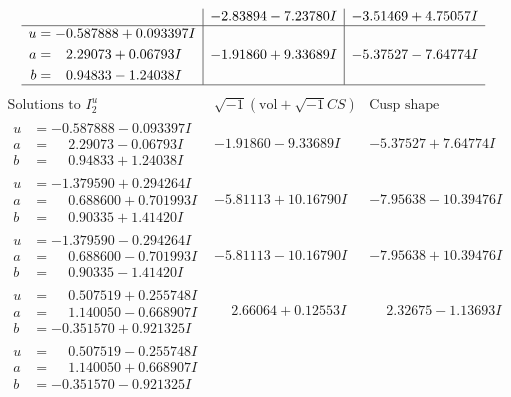 \documentclass[1p]{elsarticle_modified}
\theoremstyle{definition}
\newcommand{\I}{\sqrt{-1}}
\begin{document}
$$\begin{array}{c|c|c}
 & -2.83894 - 7.23780 I & -3.51469 + 4.75057 I \\ \hline\begin{aligned}
u &= -0.587888 + 0.093397 I \\
a &= \phantom{-}2.29073 + 0.06793 I \\
b &= \phantom{-}0.94833 - 1.24038 I\end{aligned}
 & -1.91860 + 9.33689 I & -5.37527 - 7.64774 I\\
 \hline 
 \end{array}$$\newpage$$\begin{array}{c|c|c}  
\text{Solutions to }I^u_{2}& \I (\text{vol} + \sqrt{-1}CS) & \text{Cusp shape}\\
 \hline 
\begin{aligned}
u &= -0.587888 - 0.093397 I \\
a &= \phantom{-}2.29073 - 0.06793 I \\
b &= \phantom{-}0.94833 + 1.24038 I\end{aligned}
 & -1.91860 - 9.33689 I & -5.37527 + 7.64774 I \\ \hline\begin{aligned}
u &= -1.379590 + 0.294264 I \\
a &= \phantom{-}0.688600 + 0.701993 I \\
b &= \phantom{-}0.90335 + 1.41420 I\end{aligned}
 & -5.81113 + 10.16790 I & -7.95638 - 10.39476 I \\ \hline\begin{aligned}
u &= -1.379590 - 0.294264 I \\
a &= \phantom{-}0.688600 - 0.701993 I \\
b &= \phantom{-}0.90335 - 1.41420 I\end{aligned}
 & -5.81113 - 10.16790 I & -7.95638 + 10.39476 I \\ \hline\begin{aligned}
u &= \phantom{-}0.507519 + 0.255748 I \\
a &= \phantom{-}1.140050 - 0.668907 I \\
b &= -0.351570 + 0.921325 I\end{aligned}
 & \phantom{-}2.66064 + 0.12553 I & \phantom{-}2.32675 - 1.13693 I \\ \hline\begin{aligned}
u &= \phantom{-}0.507519 - 0.255748 I \\
a &= \phantom{-}1.140050 + 0.668907 I \\
b &= -0.351570 - 0.921325 I\end{aligned}

\end{array}$$
\end{document}

